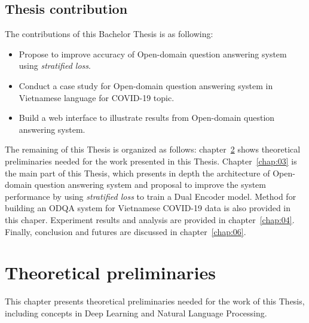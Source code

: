 \documentclass[12pt, sort&compress]{report}
\begin{document}
\section{Thesis contribution}
\label{sec:1.3}
The contributions of this Bachelor Thesis is as following:
\begin{itemize}
	\item Propose to improve accuracy of Open-domain question answering system using \textit{stratified loss}.
	\item Conduct a case study for Open-domain question answering system in Vietnamese language for COVID-19 topic.
	\item Build a web interface to illustrate results from Open-domain question answering system.
\end{itemize}
\par The remaining of this Thesis is organized as follows: chapter~\ref{chap:02} shows theoretical preliminaries needed for the work presented in this Thesis. Chapter~\ref{chap:03} is the main part of this Thesis, which presents in depth the architecture of Open-domain question answering system and proposal to improve the system performance by using \textit{stratified loss} to train a Dual Encoder model. Method for building an ODQA system for Vietnamese COVID-19 data is also provided in this chaper. Experiment results and analysis are provided in chapter~\ref{chap:04}. Finally, conclusion and futures are discussed in chapter~\ref{chap:06}.
\chapter{Theoretical preliminaries}
\label{chap:02}
This chapter presents theoretical preliminaries needed for the work of this Thesis, including concepts in Deep Learning and Natural Language Processing.
\end{document}

